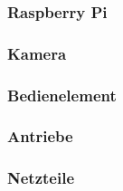 \subsubsection{Raspberry Pi}


\subsubsection{Kamera}


\subsubsection{Bedienelement}


\subsubsection{Antriebe}


\subsubsection{Netzteile}

